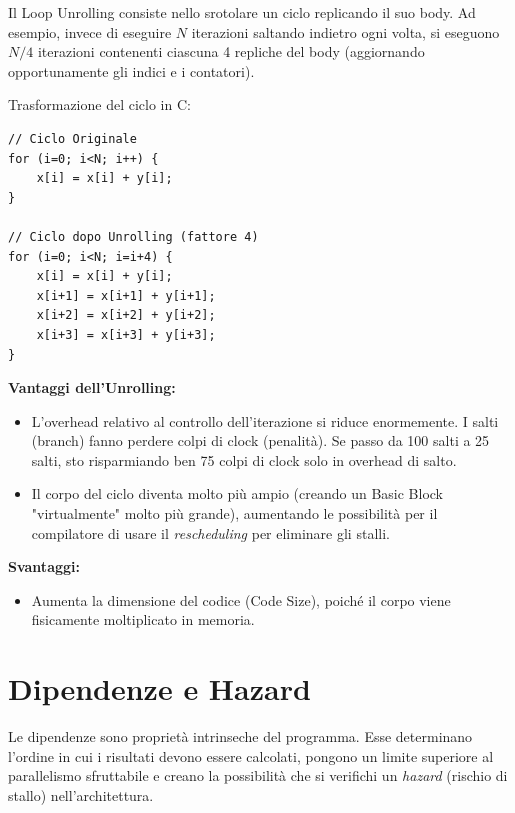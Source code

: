 \begin{definition}
Il Loop Unrolling consiste nello srotolare un ciclo replicando il suo body. Ad esempio, invece di eseguire $N$ iterazioni saltando indietro ogni volta, si eseguono $N/4$ iterazioni contenenti ciascuna 4 repliche del body (aggiornando opportunamente gli indici e i contatori).
\end{definition}

\begin{example}
Trasformazione del ciclo in C:
\begin{verbatim}
// Ciclo Originale
for (i=0; i<N; i++) {
    x[i] = x[i] + y[i];
}

// Ciclo dopo Unrolling (fattore 4)
for (i=0; i<N; i=i+4) {
    x[i] = x[i] + y[i];
    x[i+1] = x[i+1] + y[i+1];
    x[i+2] = x[i+2] + y[i+2];
    x[i+3] = x[i+3] + y[i+3];
}
\end{verbatim}
\end{example}

\begin{remark}
\textbf{Vantaggi dell'Unrolling:} 
\begin{itemize}
    \item L'overhead relativo al controllo dell'iterazione si riduce enormemente. I salti (branch) fanno perdere colpi di clock (penalità). Se passo da 100 salti a 25 salti, sto risparmiando ben 75 colpi di clock solo in overhead di salto.
    \item Il corpo del ciclo diventa molto più ampio (creando un Basic Block "virtualmente" molto più grande), aumentando le possibilità per il compilatore di usare il \textit{rescheduling} per eliminare gli stalli.
\end{itemize}
\textbf{Svantaggi:} 
\begin{itemize}
    \item Aumenta la dimensione del codice (Code Size), poiché il corpo viene fisicamente moltiplicato in memoria.
\end{itemize}
\end{remark}

\section{Dipendenze e Hazard}
Le dipendenze sono proprietà intrinseche del programma. Esse determinano l'ordine in cui i risultati devono essere calcolati, pongono un limite superiore al parallelismo sfruttabile e creano la possibilità che si verifichi un \textit{hazard} (rischio di stallo) nell'architettura.

